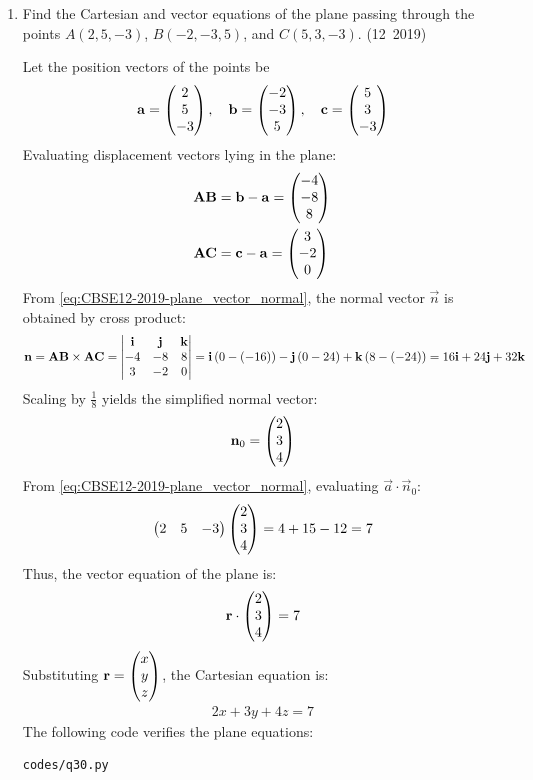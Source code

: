 \begin{enumerate}[label=\thesubsection.\arabic*, ref=\thesubsection.\theenumi]
\item Find the Cartesian and vector equations of the plane passing through the points $A(2,5,-3)$, $B(-2,-3,5)$, and $C(5,3,-3)$.
\hfill (12~2019)

\solution
Let the position vectors of the points be
\begin{align}
	\mathbf{a} = \begin{pmatrix}2 \\ 5 \\ -3\end{pmatrix}, \quad \mathbf{b} = \begin{pmatrix}-2 \\ -3 \\ 5\end{pmatrix}, \quad \mathbf{c} = \begin{pmatrix}5 \\ 3 \\ -3\end{pmatrix}
\end{align}
Evaluating displacement vectors lying in the plane:
\begin{align}
	\mathbf{AB} &= \mathbf{b} - \mathbf{a} = \begin{pmatrix}-4 \\ -8 \\ 8\end{pmatrix} \\
	\mathbf{AC} &= \mathbf{c} - \mathbf{a} = \begin{pmatrix}3 \\ -2 \\ 0\end{pmatrix}
\end{align}
From \eqref{eq:CBSE12-2019-plane_vector_normal}, the normal vector $\vec{n}$ is obtained by cross product:
\begin{align}
	\mathbf{n} = \mathbf{AB} \times \mathbf{AC} = \begin{vmatrix}\mathbf{i} & \mathbf{j} & \mathbf{k} \\ -4 & -8 & 8 \\ 3 & -2 & 0\end{vmatrix} = \mathbf{i}\left(0 - \left(-16\right)\right) - \mathbf{j}\left(0 - 24\right) + \mathbf{k}\left(8 - \left(-24\right)\right) = 16\mathbf{i} + 24\mathbf{j} + 32\mathbf{k}
\end{align}
Scaling by $\frac{1}{8}$ yields the simplified normal vector:
\begin{align}
	\mathbf{n}_0 = \begin{pmatrix}2 \\ 3 \\ 4\end{pmatrix}
\end{align}
From \eqref{eq:CBSE12-2019-plane_vector_normal}, evaluating $\vec{a} \cdot \vec{n}_0$:
\begin{align}
	\begin{pmatrix}2 & 5 & -3\end{pmatrix}\begin{pmatrix}2 \\ 3 \\ 4\end{pmatrix} = 4 + 15 - 12 = 7
\end{align}
Thus, the vector equation of the plane is:
\begin{align}
	\mathbf{r} \cdot \begin{pmatrix}2 \\ 3 \\ 4\end{pmatrix} = 7
\end{align}
Substituting $\mathbf{r} = \begin{pmatrix}x \\ y \\ z\end{pmatrix}$, the Cartesian equation is:
\begin{align}
	2x + 3y + 4z = 7
\end{align}
The following code verifies the plane equations:
\begin{lstlisting}[frame=single, basicstyle=\ttfamily\small]
	codes/q30.py
\end{lstlisting}


\end{enumerate}
